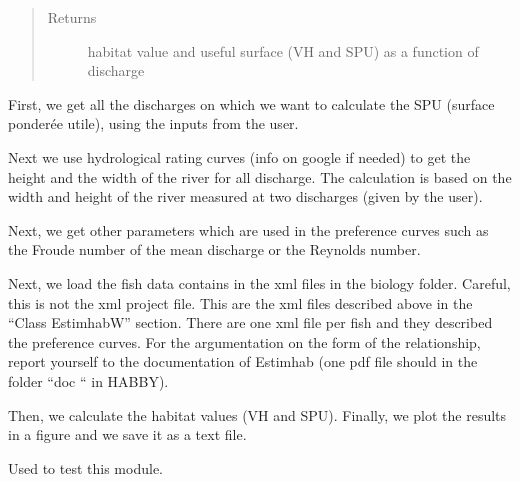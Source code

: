\documentclass[letterpaper,10pt,english]{sphinxmanual}
\begin{document}
\begin{fulllineitems}
\begin{quote}
\begin{description}
\begin{itemize}
\end{itemize}

\item[{Returns}] \leavevmode
habitat value and useful surface (VH and SPU) as a function of discharge

\end{description}\end{quote}


First, we get all the discharges on which we want to calculate the SPU (surface ponderée utile),
using the inputs from the user.

Next we use hydrological rating curves (info on google if needed) to get the height and the width of the river for
all discharge. The calculation is based on the width and height of the river measured at two discharges (given by the
user).

Next, we get other parameters which are used in the preference curves such as the Froude number of
the mean discharge or the Reynolds number.

Next, we load the fish data contains in the xml files in the biology folder. Careful, this is not the xml project
file. This are the xml files described above in the “Class EstimhabW” section. There are one xml file per fish and
they described the preference curves. For the argumentation on the form of the relationship, report yourself to the
documentation of Estimhab (one pdf file should in the folder “doc “ in HABBY).

Then, we calculate the habitat values (VH and SPU). Finally, we plot the results in a figure and we save it as
a text file.

\end{fulllineitems}


\begin{fulllineitems}
\label{\detokenize{index:src.estimhab.main}}
Used to test this module.

\end{fulllineitems}

\end{document}
